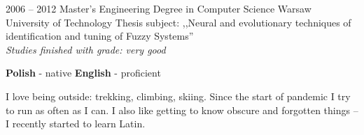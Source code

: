 \documentclass[8pt]{developercv} %
\begin{document}

\begin{entrylist}
	\entry
		{2006 -- 2012}
		{Master's Engineering Degree in Computer Science}
		{Warsaw University of Technology}
		{Thesis subject: ,,Neural and evolutionary techniques of identification and tuning of Fuzzy Systems'' \\ \textit{Studies finished with grade: very good}}
\end{entrylist}


\begin{minipage}[t]{0.5\textwidth}
	\vspace{-\baselineskip} %

	
	\textbf{Polish} - native \hspace{0.2cm} \textbf{English} - proficient
\end{minipage}
\hfill
\begin{minipage}[t]{0.5\textwidth}
	\vspace{-\baselineskip} %
	
	
	I love being outside: trekking, climbing, skiing. Since the start of pandemic I try to run as often as I can. I also like getting to know obscure and forgotten things -- I recently started to learn Latin.
\end{minipage}
\hfill

\end{document}

